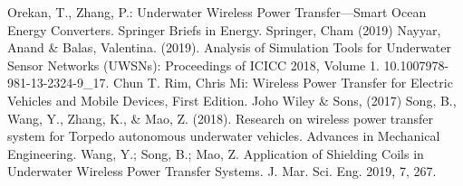  \begin{thebibliography}{99}
	 Orekan, T., Zhang, P.: Underwater Wireless Power Transfer—Smart Ocean Energy Converters. Springer Briefs in Energy. Springer, Cham (2019)
	 Nayyar, Anand \& Balas, Valentina. (2019). Analysis of Simulation Tools for Underwater Sensor Networks (UWSNs): Proceedings of ICICC 2018, Volume 1. 10.1007\/978-981-13-2324-9\_17. 
	 Chun T. Rim, Chris Mi: Wireless Power Transfer for Electric Vehicles and Mobile Devices, First Edition. Joho Wiley \& Sons, (2017)
	 Song, B., Wang, Y., Zhang, K., \& Mao, Z. (2018). Research on wireless power transfer system for Torpedo autonomous underwater vehicles. Advances in Mechanical Engineering.
	 Wang, Y.; Song, B.; Mao, Z. Application of Shielding Coils in Underwater Wireless Power Transfer Systems. J. Mar. Sci. Eng. 2019, 7, 267.
 \end{thebibliography}